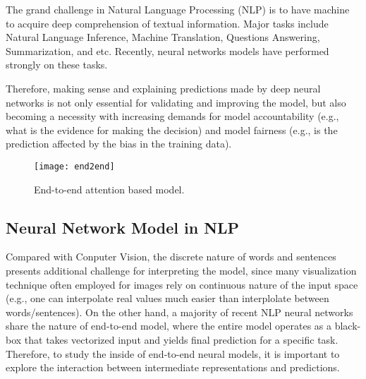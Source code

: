 The grand challenge in Natural Language Processing (NLP) is to have machine to acquire
deep comprehension of textual information. Major tasks include Natural Language Inference,
Machine Translation, Questions Answering, Summarization, and etc.
Recently, neural networks models have performed strongly on these tasks.

Therefore, making sense and explaining predictions made by deep neural networks is not only
essential for validating and improving the model, but also becoming a necessity with
increasing demands for model accountability (e.g., what is the evidence for making the decision)
and model fairness (e.g., is the prediction affected by the bias in the training data).



\begin{figure}[htbp]
\centering
\vspace{-2mm}
 \texttt{[image: end2end]}
 \caption{End-to-end attention based model.}
\label{fig:modelPipeline}
\end{figure}

\subsection{Neural Network Model in NLP}


Compared with Conputer Vision, the discrete nature of words and sentences
presents additional challenge for
interpreting the model, since many visualization technique often employed
for images rely on continuous nature of the input space (e.g., one can interpolate
real values much easier than interplolate between words/sentences).
%
On the other hand, a majority of recent NLP neural networks share the nature of
end-to-end model, where the entire model operates as a black-box that takes
vectorized input and yields final prediction for a specific task.
Therefore, to study the inside of end-to-end neural models, it is important to
explore the interaction between intermediate representations and predictions.

